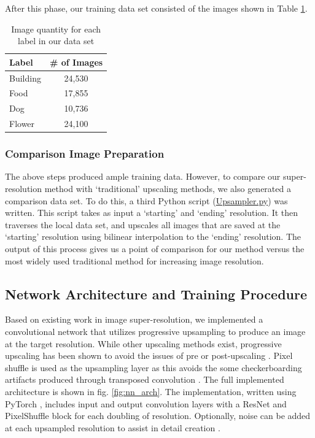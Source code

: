 \documentclass{article}
\begin{document}
After this phase, our training data set consisted of the images shown in Table \ref{tab:img-count}.
\begin{table}[h]
\centering
\begin{tabular}{@{}lc@{}}
\toprule
Label    & \multicolumn{1}{l}{\# of Images} \\ \midrule
Building & 24,530                           \\
Food     & 17,855                           \\
Dog      & 10,736                           \\
Flower   & 24,100                          
\end{tabular}
\caption{Image quantity for each label in our data set}
\label{tab:img-count}
\end{table}

\subsubsection{Comparison Image Preparation}
The above steps produced ample training data. However, to compare our super-resolution method with `traditional' upscaling methods, we also generated a comparison data set. To do this, a third Python script (\href{https://github.com/elbrandt/CS766_Project/blob/master/dataset/Retriever/Upsampler.py}{Upsampler.py}) was written. This script takes as input a `starting' and `ending' resolution. It then traverses the local data set, and upscales all images that are saved at the `starting' resolution using bilinear interpolation to the `ending' resolution.  The output of this process gives us a point of comparison for our method versus the most widely used traditional method for increasing image resolution.

\subsection{Network Architecture and Training Procedure}

Based on existing work in image super-resolution, we implemented a convolutional network that utilizes progressive upsampling to produce an image at the target resolution. While other upscaling methods exist, progressive upscaling has been shown to avoid the issues of pre or post-upscaling \cite{wang2018fully,lai2017deep}. Pixel shuffle is used as the upsampling layer as this avoids the some checkerboarding artifacts produced through transposed convolution \cite{aitken2017checkerboard}. The full implemented architecture is shown in fig. \ref{fig:nn_arch}. The implementation, written using PyTorch \cite{NEURIPS2019_9015}, includes input and output convolution layers with a ResNet \cite{he2016deep} and PixelShuffle block for each doubling of resolution. Optionally, noise can be added at each upsampled resolution to assist in detail creation \cite{karras2019style}. 
\end{document}
